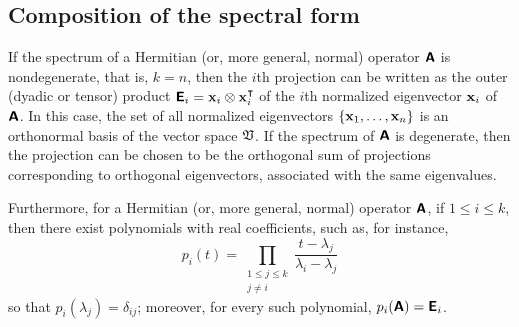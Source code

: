 \subsection{Composition of the spectral form}

If the spectrum of a  Hermitian (or, more general, normal) operator $\textsf{\textbf{A}}$ is nondegenerate, that is, $k=n$, then the
$i$th projection
can be written as the outer (dyadic or tensor) product
$
\textsf{\textbf{E}}_i={\bf x}_i \otimes {\bf x}_i^\intercal $
of the $i$th normalized eigenvector ${\bf x}_i $ of $\textsf{\textbf{A}}$.
In this case, the set of all normalized eigenvectors $\{{\bf x}_1, \ldots ,{\bf x}_n\}$ is an orthonormal basis of the vector space $\frak V$.
If the spectrum of $\textsf{\textbf{A}}$ is degenerate, then the projection can be chosen to be the orthogonal sum of projections
corresponding to orthogonal eigenvectors, associated with the same eigenvalues.

Furthermore, for a  Hermitian (or, more general, normal) operator $\textsf{\textbf{A}}$,
if $1\le i \le k$,
then there exist polynomials with real coefficients, such as,  for instance,
\begin{equation}
p_i  (t)
=
\prod_{
\begin{array}{c}
1\le j\le k\\
j\neq i
\end{array}
}
\frac{t-\lambda_j}{\lambda_i -\lambda_j}
\label{2011-m-epsf}
\end{equation}
so that
$p_i(\lambda_j) =\delta_{ij}$;
moreover, for every such polynomial,
$p_i(\textsf{\textbf{A}})=\textsf{\textbf{E}}_i$.

